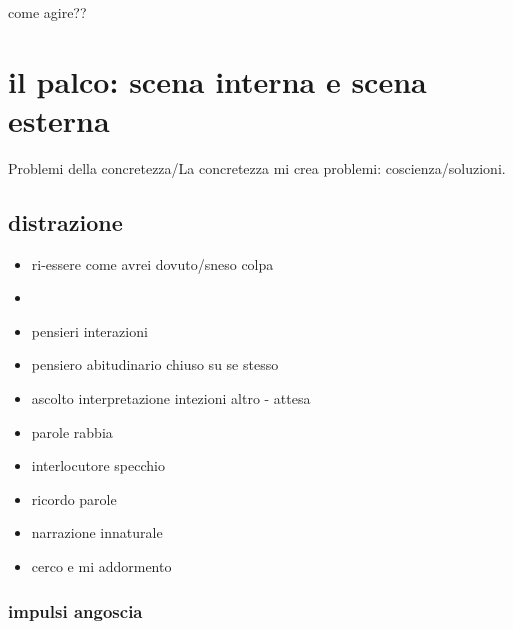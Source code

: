 come agire??

{\let\clearpage\relax
\chapter{il palco: scena interna e scena esterna}
}
Problemi della concretezza/La concretezza mi crea problemi: coscienza/soluzioni.

\PartialToc

\section{distrazione}

\begin{itemize}
\item ri-essere come avrei dovuto/sneso colpa
\item {}
\item pensieri  interazioni
\item pensiero abitudinario chiuso su se stesso
\item ascolto interpretazione intezioni altro - attesa
\item parole rabbia
\item interlocutore specchio
\item ricordo parole
\item narrazione  innaturale
\item cerco e mi addormento
\end{itemize}

\subsection{impulsi angoscia}

